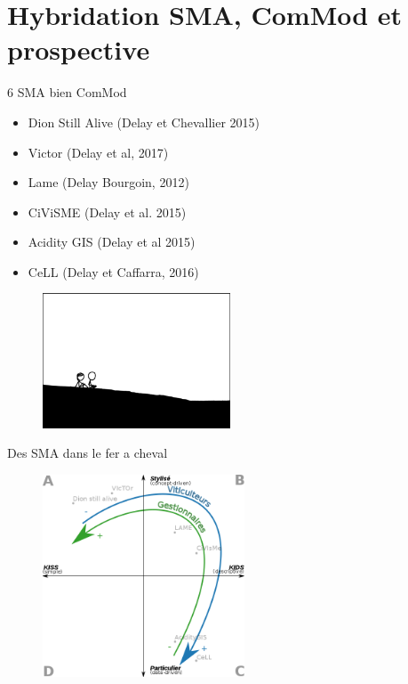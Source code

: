 \documentclass[newPxFont]{beamer}
\begin{document}
\section{Hybridation SMA, ComMod et prospective}

\begin{frame}[c]{6 SMA bien ComMod}
  \vspace{-2em}
  \begin{itemize}
    \item Dion Still Alive (Delay et Chevallier 2015)
    \item Victor (Delay et al, 2017)
    \item Lame (Delay Bourgoin, 2012)
    \item CiViSME (Delay et al. 2015)
    \item Acidity GIS (Delay et al 2015)
    \item CeLL (Delay et Caffarra, 2016)
  \end{itemize}
  \begin{figure}
   \includegraphics[height=4cm]{img/a_contemplation.png}
  \end{figure}
\end{frame}

\begin{frame}[c]{Des SMA dans le fer a cheval}
  \vspace{-2em}
  \begin{figure}
   \includegraphics[height=6cm]{img/a_banos_sanders_positionnements.png}
  \end{figure}
\end{frame}
\end{document}
